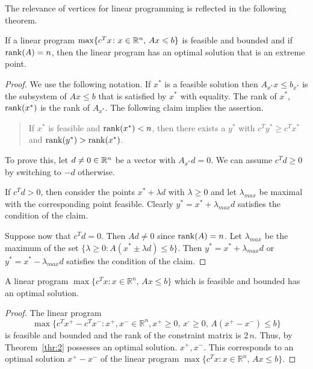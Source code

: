 The relevance of vertices for linear programming is reflected in the following theorem. 

\begin{theorem}
  \label{thr:2}
  If a linear program $\max\{c^Tx \colon x \in \mathbb{R}^n, \, Ax \leqslant b\}$
  is feasible and bounded and if $\mathrm{rank}(A) = n$, then the linear program has an optimal solution that is  an extreme point. 
\end{theorem}


\begin{proof}
  We use the following notation. If $x^*$ is a feasible solution then
  $A_{x^*} x \leq b_{x^*}$ is the subsystem of $Ax \leq b$ that is
  satisfied by $x^*$ with equality. The rank of $x^*$, $\mathrm{rank}(x^*)$ is
  the rank of $A_{x^*}$.  The following claim implies the assertion. 
  \begin{quote}
    If $x^*$ is feasible and $\mathrm{rank}(x^*) < n$, then there exists a
    $y^*$ with $c^T y^* \geq c^Tx^*$ and $\mathrm{rank}(y^*)>\mathrm{rank}(x^*)$.
  \end{quote}
  To prove this, let $d \neq 0 \in \mathbb{R}^n$ be a vector with $A_{x^*}d =
  0$.  We can assume $c^Td \geq 0$ by switching to $-d$ otherwise.

  If $c^Td >0$, then consider the points $x^* + \lambda d$ with
  $\lambda \geq 0$ and let $\lambda_{max}$ be maximal with the
  corresponding point feasible. Clearly $y^* = x^* + \lambda_{max} d$
  satisfies the condition of the claim. 

  Suppose now that  $c^T d = 0$. Then $A d \neq 0$ since $\mathrm{rank}(A) = n$. Let $\lambda_{max}$ be the maximum of the set $\{\lambda \geq 0 \colon A (x^* \pm \lambda d) \leq b\}$. Then $y^* = x^* + \lambda_{max}d$ or $y^* = x^* - \lambda_{max}d$  satisfies the condition of the claim. 
  
\end{proof}



\begin{corollary}
  \label{co:12}
  A linear program $\max \{ c^Tx : x ∈ ℝ^n, \, Ax ≤ b\}$ which is feasible and bounded has an optimal solution. 
\end{corollary}


\begin{proof}
  The linear program 
  \begin{displaymath}
    \max \{ c^Tx^+ -c^T x^- : x^+,x^- ∈ ℝ^n, x^+≥0, \, x^‐≥0, \, A(x^+-x^-) ≤ b\}
  \end{displaymath}
 is feasible and bounded and the rank of the constraint matrix is $2\,n$.  Thus, by Theorem~\ref{thr:2} possesses an optimal solution. $x^+,x^-$. This corresponds to an optimal solution $x^+-x^-$ of the linear program $\max \{ c^Tx : x ∈ ℝ^n, \, Ax ≤ b\}$. 
\end{proof}

